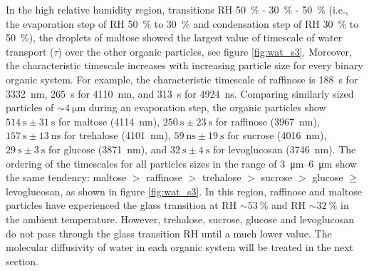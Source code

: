 In the high relative humidity region, transitions RH \SI{50}{\percent} - \SI{30}{\percent} - \SI{50}{\percent} (i.e., the evaporation step of RH \SI{50}{\percent} to \SI{30}{\percent} and condensation step of RH \SI{30}{\percent} to \SI{50}{\percent}), the droplets of maltose showed the largest value of timescale of water transport ($\tau$) over the other organic particles, see figure \ref{fig:wat_s3}. Moreover, the characteristic timescale increases with increasing particle size for every binary organic system. For example, the characteristic timescale of raffinose is \SI{188}{\second} for \SI{3332}{\nano\meter}, \SI{265}{\second} for \SI{4110}{\nano\meter}, and \SI{313}{\second} for \SI{4924}{\nano\second}. Comparing similarly sized particles of $\sim \SI{4}{\micro\meter}$ during an evaporation step, the organic particles show $\SI{514}{\second} \pm \SI{31}{\second}$ for maltose (\SI{4114}{\nano\meter}), $\SI{250}{\second} \pm \SI{23}{\second}$ for raffinose (\SI{3967}{\nano\meter}), $\SI{157}{\second} \pm \SI{13}{\nano\second}$ for trehalose (\SI{4101}{\nano\meter}), $\SI{59}{\nano\second} \pm \SI{19}{\second}$ for sucrose (\SI{4016}{\nano\meter}), $\SI{29}{\second} \pm \SI{3}{\second}$ for glucose (\SI{3871}{\nano\meter}), and $\SI{32}{\second} \pm \SI{4}{\second}$ for levoglucosan (\SI{3746}{\nano\meter}). The ordering of the timescales for all particles sizes in the range of \SIrange[range-phrase=--]{3}{6}{\micro\meter} show the same tendency: maltose $>$ raffinose $>$ trehalose $>$ sucrose $>$ glucose $\ge$ levoglucosan, as shown in figure \ref{fig:wat_s3}. In this region, raffinose and maltose particles have experienced the glass transition at RH $\sim \SI{53}{\percent}$ and RH $\sim\SI{32}{\percent}$ in the ambient temperature.\cite{Song2016a,Tong2011} However, trehalose, sucrose, glucose and levoglucosan do not pass through the glass transition RH until a much lower value. The molecular diffusivity of water in each organic system will be treated in the next section.

